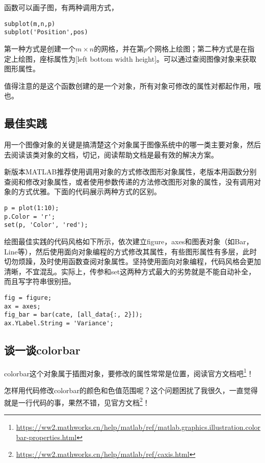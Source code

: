 函数可以画子图，有两种调用方式，

\begin{verbatim}
subplot(m,n,p)
subplot('Position',pos)
\end{verbatim}

第一种方式是创建一个$ m\times n $的网格，并在第$ p $个网格上绘图；第二种方式是在指定上绘图，座标属性为[left bottom width height]。可以通过查阅图像对象来获取图形属性。

值得注意的是这个函数创建的是一个对象，所有对象可修改的属性对都起作用，哦也。

\subsection{最佳实践}

用一个图像对象的关键是搞清楚这个对象属于图像系统中的哪一类主要对象，然后去阅读该类对象的文档，切记，阅读帮助文档是最有效的解决方案。

新版本MATLAB推荐使用调用对象的方式修改图形对象属性，老版本用函数分别查阅和修改对象属性，或者使用参数传递的方法修改图形对象的属性，没有调用对象的方式优雅。下面的代码展示两种方式的区别。

\begin{verbatim}
p = plot(1:10);
p.Color = 'r';
set(p, 'Color', 'red');
\end{verbatim}

绘图最佳实践的代码风格如下所示，依次建立figure，axes和图表对象（如Bar，Line等），然后使用面向对象编程的方式修改其属性，有些图形属性有多层，此时切勿烦躁，及时使用函数查阅对象属性。坚持使用面向对象编程，代码风格会更加清晰，不宜混乱。实际上，传参和set这两种方式最大的劣势就是不能自动补全，而且写字符串很别扭。

\begin{verbatim}
fig = figure;
ax = axes;
fig_bar = bar(cate, [all_data{:, 2}]);
ax.YLabel.String = 'Variance';
\end{verbatim}

\subsection{谈一谈colorbar}

colorbar这个对象属于插图对象，要修改的属性常常是位置，阅读官方文档吧\footnote{\url{https://ww2.mathworks.cn/help/matlab/ref/matlab.graphics.illustration.colorbar-properties.html}}！

怎样用代码修改colorbar的颜色和色值范围呢？这个问题困扰了我很久，一直觉得就是一行代码的事，果然不错，见官方文档\footnote{\url{https://ww2.mathworks.cn/help/matlab/ref/caxis.html}}！


